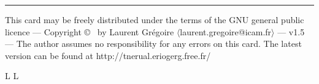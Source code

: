 \vfill \hrule\smallskip
{\smallrm This card may be freely distributed under
the terms of the GNU general public licence ---
Copyright \copyright\ {} by Laurent Gr\'egoire
$\langle${\smalltt laurent.gregoire@icam.fr}$\rangle$ --- v1.5 ---
The author assumes no responsibility for any errors on this card.
The latest version can be found at
{\smalltt http://tnerual.eriogerg.free.fr/}}

\supereject
\if L\lr \else\null\vfill\eject\fi
\if L\lr \else\null\vfill\eject\fi
\bye

